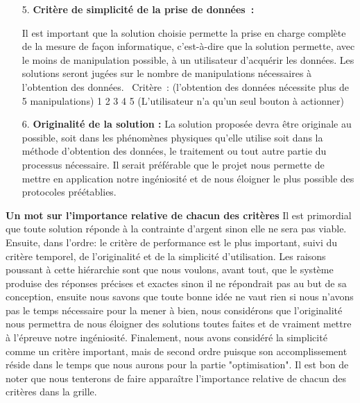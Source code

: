 \documentclass{standalone}
\begin{document}
\begin{enumerate}
	
	\item [5.]
	\textbf{Critère de simplicité de la prise de données :}
	
	Il est important que la solution choisie permette la prise en charge complète de la mesure de façon informatique, c’est-à-dire que la solution permette, avec le moins de manipulation possible, à un utilisateur d’acquérir les données. Les solutions seront jugées sur le nombre de manipulations nécessaires à l’obtention des données. 
	Critère : (l’obtention des données nécessite plus de 5 manipulations) 1 2 3 4 5 (L’utilisateur n’a qu’un seul bouton à actionner) 
	
	\item[6.] 
\textbf{	Originalité de la solution :}
La solution proposée devra être originale au possible, soit dans les phénomènes physiques qu'elle utilise soit dans la méthode d'obtention des données, le traitement ou tout autre partie du processus nécessaire. Il serait préférable que le projet nous permette de mettre en application notre ingéniosité et de nous éloigner le plus possible des protocoles préétablies.   
\end{enumerate}

\textbf{Un mot sur l'importance relative de chacun des critères}
 Il est primordial que toute solution réponde à la contrainte d'argent sinon elle ne sera pas viable. Ensuite, dans l'ordre: le critère de performance est le plus important, suivi du critère temporel, de l'originalité et de la simplicité d'utilisation. Les raisons poussant à cette hiérarchie sont que nous voulons, avant tout, que le système produise des réponses précises et exactes sinon il ne répondrait pas au but de sa conception, ensuite nous savons que toute bonne idée ne vaut rien si nous n'avons pas le temps nécessaire pour la mener à bien, nous considérons que l'originalité nous permettra de nous éloigner des solutions toutes faites et de vraiment mettre à l'épreuve notre ingéniosité. Finalement, nous avons considéré la simplicité comme un critère important, mais de second ordre puisque son accomplissement réside dans le temps que nous aurons pour la partie "optimisation". Il est bon de noter que nous tenterons de faire apparaître l'importance relative de chacun des critères dans la grille.
\end{document}
